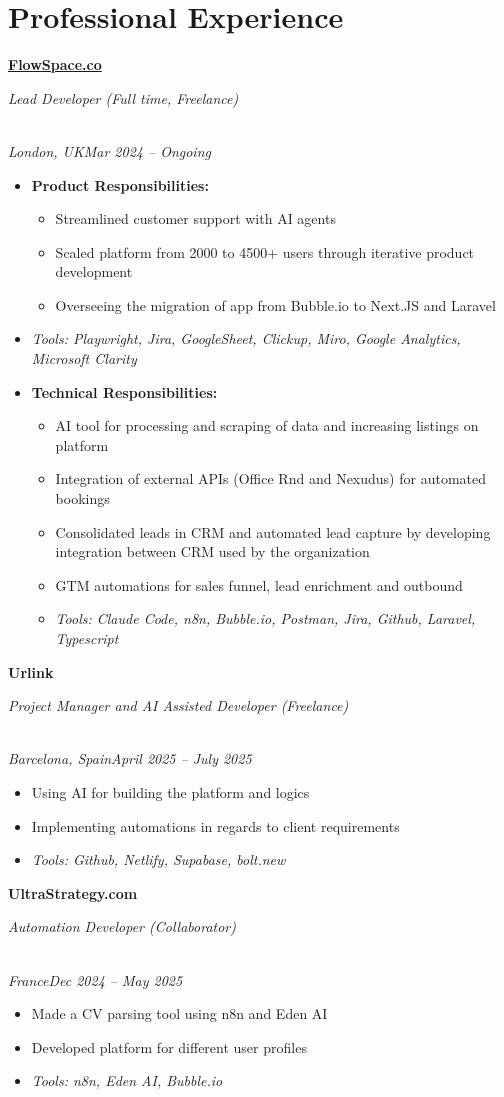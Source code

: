 \documentclass[a4paper,10pt]{article}
\newcommand{\role}[4]{\vspace{3pt}\noindent\hspace{0.6em}\parbox[t]{0.38\textwidth}{\raggedright\textbf{#1}}\hfill\parbox[t]{0.58\textwidth}{\raggedleft\textit{#2}}\\{\textit{#3}\hfill\textit{#4}}\vspace{1pt}}
\begin{document}
\section{Professional Experience}
\role{\href{https://flowspace.co}{FlowSpace.co}}{Lead Developer (Full time, Freelance)}{London, UK}{Mar 2024 -- Ongoing}
\begin{itemize}
\item \textbf{Product Responsibilities:}
\begin{itemize}[label=--]
\item Streamlined customer support with AI agents
\item Scaled platform from 2000 to 4500+ users through iterative product development
\item Overseeing the migration of app from Bubble.io to Next.JS and Laravel
\end{itemize}
\item \textit{Tools: Playwright, Jira, GoogleSheet, Clickup, Miro, Google Analytics, Microsoft Clarity}
\item \textbf{Technical Responsibilities:}
\begin{itemize}[label=--]
\item AI tool for processing and scraping of data and increasing listings on platform
\item Integration of external APIs (Office Rnd and Nexudus) for automated bookings
\item Consolidated leads in CRM and automated lead capture by developing integration between CRM used by the organization
\item GTM automations for sales funnel, lead enrichment and outbound
\item \textit{Tools: Claude Code, n8n, Bubble.io, Postman, Jira, Github, Laravel, Typescript}
\end{itemize}
\end{itemize}

\role{Urlink}{Project Manager and AI Assisted Developer (Freelance)}{Barcelona, Spain}{April 2025 -- July 2025}
\begin{itemize}
\item Using AI for building the platform and logics
\item Implementing automations in regards to client requirements
\item \textit{Tools: Github, Netlify, Supabase, bolt.new}
\end{itemize}

\role{UltraStrategy.com}{Automation Developer (Collaborator)}{France}{Dec 2024 -- May 2025}
\begin{itemize}
\item Made a CV parsing tool using n8n and Eden AI
\item Developed platform for different user profiles
\item \textit{Tools: n8n, Eden AI, Bubble.io}
\end{itemize}
\end{document}
